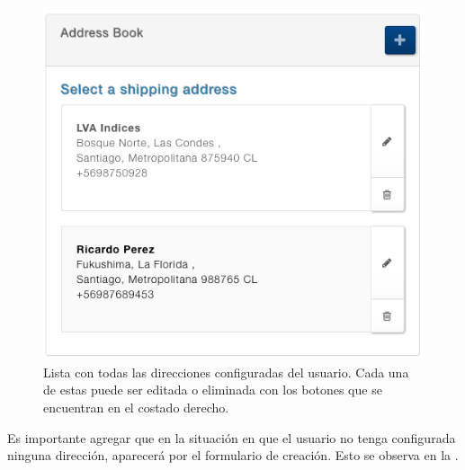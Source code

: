 		\begin{figure}[h!]
			\centering
			\includegraphics[width=1\textwidth]{figuras/address/form/list_address.png}
			\caption{Lista con todas las direcciones configuradas del usuario. Cada una de estas puede ser editada o eliminada con los botones que se encuentran en el costado derecho.}
			\label{figure:address:form:list_address}
		\end{figure}

		Es importante agregar que en la situación en que el usuario no tenga configurada ninguna dirección, aparecerá por  el formulario de creación. Esto se observa en la .


